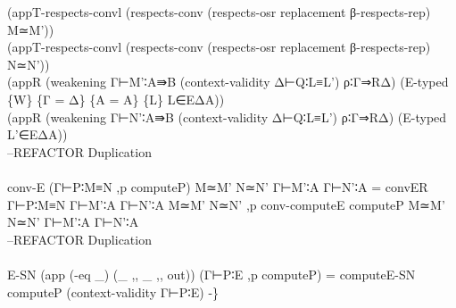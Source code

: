 {\begin{code}
{\>  (appT-respects-convl (respects-conv (respects-osr replacement β-respects-rep) M≃M')) \<\\
\>  (appT-respects-convl (respects-conv (respects-osr replacement β-respects-rep) N≃N')) \<\\
\>  (appR (weakening Γ⊢M'∶A⇛B (context-validity Δ⊢Q∶L≡L') ρ∶Γ⇒RΔ) (E-typed \{W\} \{Γ = Δ\} \{A = A\} \{L\} L∈EΔA)) \<\\
\>  (appR (weakening Γ⊢N'∶A⇛B (context-validity Δ⊢Q∶L≡L') ρ∶Γ⇒RΔ) (E-typed L'∈EΔA)) \<\\
\>--REFACTOR Duplication\<\\
\>\<\\
\>conv-E (Γ⊢P∶M≡N ,p computeP) M≃M' N≃N' Γ⊢M'∶A Γ⊢N'∶A = convER Γ⊢P∶M≡N Γ⊢M'∶A Γ⊢N'∶A M≃M' N≃N' ,p conv-computeE computeP M≃M' N≃N' Γ⊢M'∶A Γ⊢N'∶A\<\\
\>--REFACTOR Duplication                      \<\\
\>                 \<\\
\>E-SN (app (-eq \_) (\_ ,, \_ ,, out)) (Γ⊢P∶E ,p computeP) = computeE-SN computeP (context-validity Γ⊢P∶E) -\}}\<%
\\
%
\\
\>  \AgdaSymbol{\{}\AgdaSymbol{\}} \AgdaSymbol{(} \AgdaSymbol{:}  \AgdaSymbol{)} \AgdaSymbol{:}  \AgdaSymbol{\{}\AgdaSymbol{\}}           \<%
\\
\>[0]\<[2]%
\>[2]\AgdaInductiveConstructor{[]} \AgdaSymbol{:}   \AgdaInductiveConstructor{[]} \AgdaInductiveConstructor{[]}\<%
\\
\>[0]\<[2]%
\>[2] \AgdaSymbol{:}  \AgdaSymbol{\{}  \AgdaSymbol{\}} \AgdaSymbol{\{} \AgdaSymbol{:}  \AgdaSymbol{(}  \AgdaSymbol{)} \AgdaSymbol{(} \AgdaSymbol{)\}} \AgdaSymbol{\{} \AgdaSymbol{\}}    \AgdaSymbol{\{}\AgdaSymbol{\}}     \AgdaSymbol{\{} \AgdaSymbol{=} \AgdaSymbol{\}}  \AgdaSymbol{(}    \AgdaSymbol{)}     \AgdaSymbol{(}  \AgdaSymbol{)} \AgdaSymbol{(}  \AgdaSymbol{)}\<%

\end{code}}
